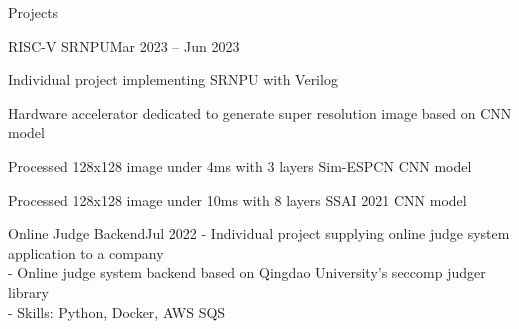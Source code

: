 \documentclass{resume}
\begin{document}
\begin{rSection}{Projects}
\begin{rSubsection}{RISC-V SRNPU}{Mar 2023 -- Jun 2023}
        \item Individual project implementing SRNPU with Verilog

        \item Hardware accelerator dedicated to generate super resolution image based on CNN model

        \item Processed 128x128 image under 4ms with 3 layers Sim-ESPCN CNN model

        \item Processed 128x128 image under 10ms with 8 layers SSAI 2021 CNN model
    \end{rSubsection}

    \begin{rSubsection}{Online Judge Backend}{Jul 2022}
        - Individual project supplying online judge system application to a company \\
        - Online judge system backend based on Qingdao University's seccomp judger library \\
        - Skills: Python, Docker, AWS SQS
    \end{rSubsection}
    
\end{rSection}
\end{document}
